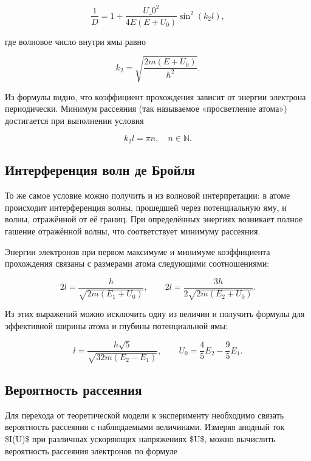 \documentclass[a4paper,12pt]{article} %
\begin{document}
\begin{equation}
    \frac{1}{D} = 1 + \frac{U\_0^2}{4 E (E+U_0)} \sin^2(k_2 l),
\end{equation}

где волновое число внутри ямы равно

\begin{equation}
    k_2 = \sqrt{\frac{2 m (E+U_0)}{\hbar^2}}.
\end{equation}

Из формулы видно, что коэффициент прохождения зависит от энергии электрона периодически. Минимум рассеяния (так называемое «просветление атома») достигается при выполнении условия

\begin{equation}
k_2 l = \pi n, \quad n \in \mathbb{N}.
\end{equation}

\subsection*{Интерференция волн де Бройля}

То же самое условие можно получить и из волновой интерпретации: в атоме происходит интерференция волны, прошедшей через потенциальную яму, и волны, отражённой от её границ.
При определённых энергиях возникает полное гашение отражённой волны, что соответствует минимуму рассеяния.

Энергии электронов при первом максимуме и минимуме коэффициента прохождения связаны с размерами атома следующими соотношениями:

\begin{equation}
2 l = \frac{h}{\sqrt{2 m (E_1 + U_0)}}, \qquad
2 l = \frac{3h}{2\sqrt{2 m (E_2 + U_0)}}.
\end{equation}

Из этих выражений можно исключить одну из величин и получить формулы для эффективной ширины атома и глубины потенциальной ямы:

\begin{equation}
l = \frac{h \sqrt{5}}{\sqrt{32 m (E_2 - E_1)}}, \qquad
U_0 = \frac{4}{5} E_2 - \frac{9}{5} E_1.
\end{equation}

\subsection*{Вероятность рассеяния}

Для перехода от теоретической модели к эксперименту необходимо связать вероятность рассеяния с наблюдаемыми величинами.
Измеряя анодный ток \$I(U)\$ при различных ускоряющих напряжениях \$U\$, можно вычислить вероятность рассеяния электронов по формуле
\end{document}
